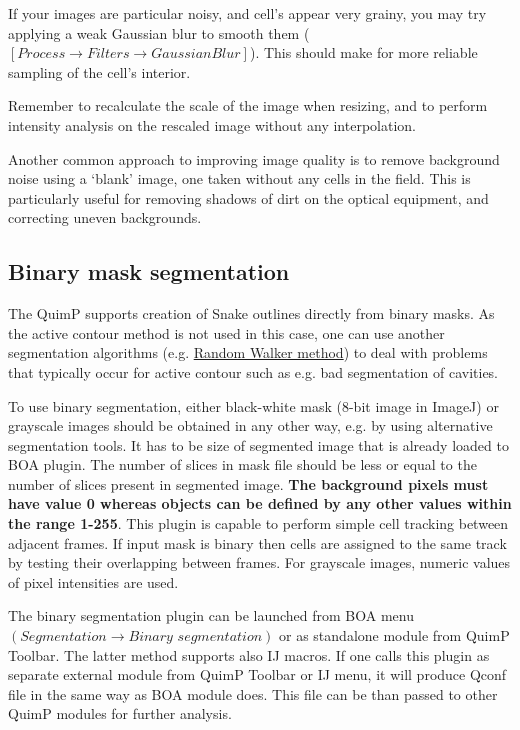 \documentclass[a4paper,12pt]{article}
\begin{document}
If your images are particular noisy, and cell's appear very grainy, you may try applying a weak Gaussian blur to smooth them
($[Process\rightarrow Filters\rightarrow Gaussian Blur]$).  This should make for more reliable sampling of the cell's interior.

Remember to recalculate the scale of the image when resizing, and to perform intensity analysis on the rescaled image without any interpolation.

Another common approach to improving image quality is to remove background noise using a `blank' image, one taken without any
cells in the field.  This is particularly useful for removing shadows of dirt on the optical equipment, and correcting uneven backgrounds.

\subsection{Binary mask segmentation} \label{sec:Binary_seg}
The QuimP supports creation of Snake outlines directly from binary masks. As the active contour method is not used in this case, one can use another segmentation algorithms (e.g. \hyperref[sec:RWSeg]{Random Walker method}) to deal with problems that typically occur for active contour such as e.g. bad segmentation of cavities.

To use binary segmentation, either black-white mask (8-bit image in ImageJ) or grayscale images should be obtained in any other way, e.g. by using alternative segmentation tools. It has to be size of segmented image that is already loaded to BOA plugin. The number of slices in mask file should be less or equal to the number of slices present in segmented image. \textbf{The background pixels must have value 0 whereas objects can be defined by any other values within the range 1-255}. This plugin is capable to perform simple cell tracking between adjacent frames. If input mask is binary then cells are assigned to the same track by testing their overlapping between frames. For grayscale images, numeric values of pixel intensities are used.

The binary segmentation plugin can be launched from BOA menu $(\textit{Segmentation}\rightarrow \textit{Binary segmentation})$ or as standalone module from QuimP Toolbar. The latter method supports also IJ macros. If one calls this plugin as separate external module from QuimP Toolbar or IJ menu, it will produce Qconf file in the same way as BOA module does. This file can be than passed to other QuimP modules for further analysis.   
\end{document}
